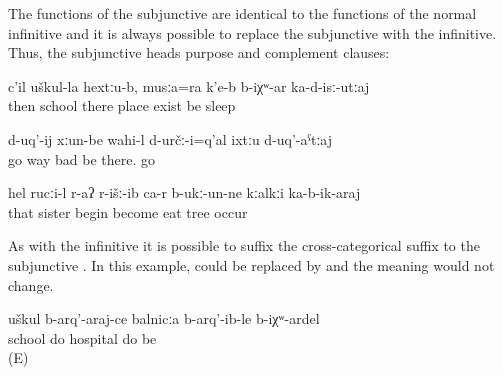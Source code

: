 The functions of the subjunctive are identical to the functions of the normal infinitive and it is always possible to replace the subjunctive with the infinitive. Thus, the subjunctive heads purpose and complement clauses:
%
\begin{exe}
	\ex	\label{ex:‎Then there at the school, there is a place, if it still exists, for you to sleep}
	\gll	c'il	uškul-la		hextːu-b,		musːa=ra		k'e-b b-iχʷ-ar				ka-d-isː-utːaj	\\
		then	school	there	place	exist		be	sleep\\
	\glt	{}

	\ex	\label{ex:‎The roads to go there were probably bad, for you to go}
	\gll	d-uq'-ij	xːun-be	wahi-l	d-určː-i=q'al	ixtːu	d-uq'-aˁtːaj\\
		go	way	bad	be	there.	go\\
	\glt	{}

	\ex	\label{ex:‎The sister started to eat up the tree so it would come down}
	\gll	hel	rucːi-l	r-aʔ	r-išː-ib	ca-r	b-ukː-un-ne	kːalkːi	ka-b-ik-araj\\
		that	sister	\tsc{f-}begin	become		eat	tree	occur\\
	\glt	{}
\end{exe}

As with the infinitive it is possible to suffix the cross-categorical suffix  to the subjunctive . In this example,  could be replaced by  and the meaning would not change.
%
\begin{exe}
	\ex	\label{ex:‎It would be better to build a hospital instead of building a school}
	\gll	uškul	b-arq'-araj-ce	balnicːa	b-arq'-ib-le	b-iχʷ-ardel\\
		school	do	hospital	do	be\\
	\glt	{} (E)
\end{exe}

